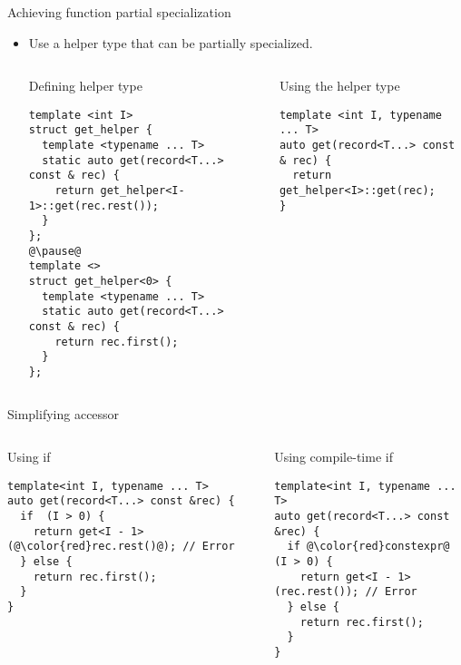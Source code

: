 \begin{frame}[t,fragile]{Achieving function partial specialization}
\begin{itemize}
  \item Use a helper type that can be partially specialized.

\begin{columns}[T]

\begin{block}{Defining helper type}
\begin{lstlisting}[escapechar=@]
template <int I>
struct get_helper {
  template <typename ... T>
  static auto get(record<T...> const & rec) {
    return get_helper<I-1>::get(rec.rest());
  }
};
@\pause@
template <>
struct get_helper<0> {
  template <typename ... T>
  static auto get(record<T...> const & rec) {
    return rec.first();
  }
};
\end{lstlisting}
\end{block}

\pause
{}
\begin{block}{Using the helper type}
\begin{lstlisting}
template <int I, typename ... T>
auto get(record<T...> const & rec) {
  return get_helper<I>::get(rec);
}
\end{lstlisting}
\end{block}

\end{columns}

\end{itemize}
\end{frame}


\begin{frame}[t,fragile]{Simplifying accessor}
\begin{columns}[T]

\begin{block}{Using if}
\begin{lstlisting}[escapechar=@]
template<int I, typename ... T>
auto get(record<T...> const &rec) {
  if  (I > 0) {
    return get<I - 1>(@\color{red}rec.rest()@); // Error
  } else {
    return rec.first();
  }
}
\end{lstlisting}
\end{block}

\pause
{}
\begin{block}{Using compile-time if}
\begin{lstlisting}[escapechar=@]
template<int I, typename ... T>
auto get(record<T...> const &rec) {
  if @\color{red}constexpr@ (I > 0) {
    return get<I - 1>(rec.rest()); // Error
  } else {
    return rec.first();
  }
}
\end{lstlisting}
\end{block}
\end{columns}
\end{frame}
